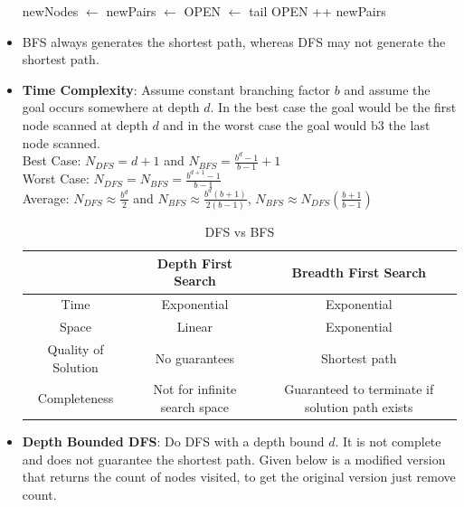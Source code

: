 \documentclass[a4paper]{article}
\begin{document}
\begin{itemize}
\begin{algorithm}
\begin{algorithmic}
                \State newNodes $\gets$ 
                \State newPairs $\gets$ 
                \State OPEN $\gets$ tail OPEN ++ newPairs 
            \EndWhile
            \State \Return [ ]
        \end{algorithmic}
    \end{algorithm}
    \item BFS always generates the shortest path, whereas DFS may not generate the shortest path.
    \item \textbf{Time Complexity}: Assume constant branching factor $b$ and assume the goal occurs somewhere at depth $d$. In the best case the goal would be the first node scanned at depth $d$ and in the worst case the goal would b3 the last node scanned.\\
    Best Case: $N_{DFS}=d+1$ and $N_{BFS}=\frac{b^{d}-1}{b-1}+1$\\
    Worst Case: $N_{DFS}=N_{BFS}=\frac{b^{d+1}-1}{b-1}$\\
    Average: $N_{DFS}\approx \frac{b^d}{2}$ and $N_{BFS}\approx \frac{b^d(b+1)}{2(b-1)}$, $N_{BFS}\approx N_{DFS}(\frac{b+1}{b-1})$
    \begin{table}[H]
        \centering
        \begin{tabular}{|c|c|c|}
            \hline
             & Depth First Search & Breadth First Search \\
             \hline
            Time & Exponential & Exponential\\
            \hline
            Space & Linear & Exponential\\
            \hline
            Quality of Solution & No guarantees & Shortest path\\
            \hline
            Completeness & Not for infinite search space & Guaranteed to terminate if solution path exists\\
            \hline
        \end{tabular}
        \caption{DFS vs BFS}
        \label{tab:AI-DFS-vs-BFS}
    \end{table}
    \item \textbf{Depth Bounded DFS}: Do DFS with a depth bound $d$. It is not complete and does not guarantee the shortest path. Given below is a modified version that returns the count of nodes visited, to get the original version just remove count.
    \begin{algorithm}[H]

\end{algorithm}
\end{itemize}
\end{document}
